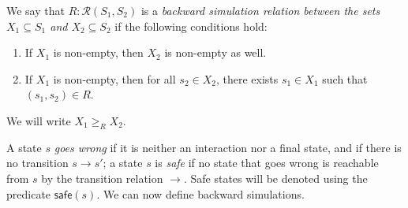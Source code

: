 \documentclass[sigplan,10pt,review,anonymous]{acmart}
\newcommand{\kw}[1]{\ensuremath{ \mathsf{#1} }}
\begin{document}
\begin{definition}
We say that $R : \mathcal{R}(S_1, S_2)$ is a
\emph{backward simulation relation
  between the sets $X_1 \subseteq S_1$ and  $X_2 \subseteq S_2$}
if the following conditions hold:
\begin{enumerate}
\item
  If $X_1$ is non-empty,
  then $X_2$ is non-empty as well.
\item
  If $X_1$ is non-empty,
  then for all $s_2 \in X_2$,
  there exists $s_1 \in X_1$
  such that $(s_1, s_2) \in R$.
\end{enumerate}
We will write $X_1 \ge_R X_2$.
\end{definition}

A state $s$ \emph{goes wrong}
if it is neither an interaction nor a final state,
and if there is no transition $s \rightarrow s'$;
a state $s$ is \emph{safe}
if no state that goes wrong is reachable from $s$
by the transition relation $\rightarrow$.
Safe states will be denoted using the predicate $\kw{safe}(s)$.
We can now define backward simulations.
\end{document}
